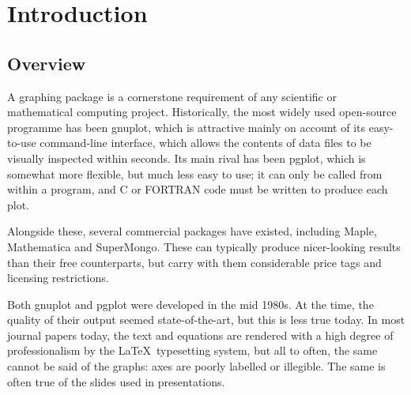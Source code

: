 %
%
%
%
%



\chapter{Introduction}

\label{introduction}

\section{Overview}

A graphing package is a cornerstone requirement of any scientific or
mathematical computing project.  Historically, the most widely used open-source
programme has been {\sc gnuplot}, which is attractive mainly on account of its
easy-to-use command-line interface, which allows the contents of data files to
be visually inspected within seconds.  Its main rival has been {\sc pgplot},
which is somewhat more flexible, but much less easy to use; it can only be
called from within a program, and C or FORTRAN code must be written to produce
each plot.

Alongside these, several commercial packages have existed, including {\sc
Maple}, {\sc Mathematica} and {\sc SuperMongo}.  These can typically produce
nicer-looking results than their free counterparts, but carry with them
considerable price tags and licensing restrictions.

Both gnuplot and pgplot were developed in the mid 1980s. At the time, the
quality of their output seemed state-of-the-art, but this is less true today.
In most journal papers today, the text and equations are rendered with a high
degree of professionalism by the \LaTeX\ typesetting system, but all to often,
the same cannot be said of the graphs: axes are poorly labelled or illegible.
The same is often true of the slides used in presentations.

